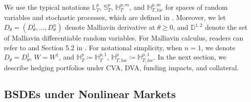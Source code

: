 \documentclass[a4paper, 11pt]{article}              %
\numberwithin{equation}{section}
\theoremstyle{plain}
\newcommand{\1}{\mathds{1}}
\newcommand{\dsH}{\mathbb{H}}
\newcommand{\dsL}{\mathbb{L}}
\newcommand{\dsS}{\mathbb{S}}
\newcommand{\dsD}{\mathbb{D}}
\theoremstyle{plain}
\theoremstyle{definition}
\theoremstyle{plain}
\begin{document}
We use the typical notations $\dsL^p_T$, $\dsS^p_T$, $\dsH^{p, m}_T$, and
$\dsH^{p, m}_{T, loc}$ for spaces of random variables and stochastic processes, which
are defined in . 
Moreover, we let $D_{\theta}=(D^1_\theta, \dots, D^n_\theta)$ denote Malliavin derivative at
$\theta \geq0$, and $\dsD^{1, 2}$ denote the set of Malliavin differentiable random
variables. For Malliavin calculus, readers can refer to \cite{di2009malliavin}
and Section 5.2 in \cite{el1997backward}. 
For notational simplicity, when $n=1$, we denote $D_\theta = D^1_\theta$,
$W = W^1$, and $\dsH^p_T\coloneqq \dsH^{p, 1}_T$,
$\dsH^p_{T, loc}\coloneqq \dsH^{p, 1}_{T, loc}$.
In the next section, we describe
hedging portfolios under CVA, DVA, funding impacts, and collateral.
\subsection{BSDEs under Nonlinear Markets}
\end{document}
